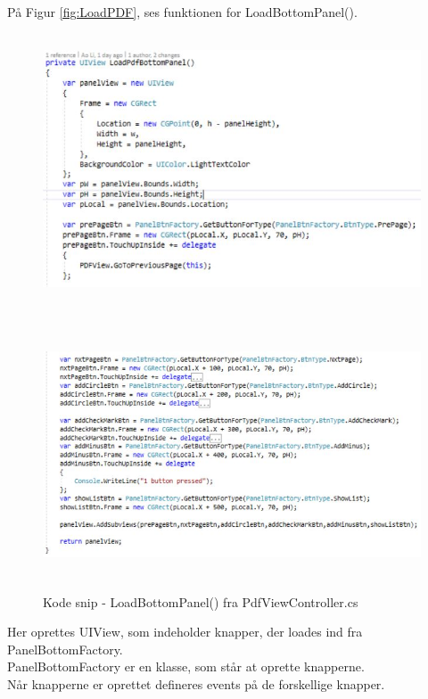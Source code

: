 På Figur \ref{fig:LoadPDF}, ses funktionen for LoadBottomPanel().
\begin{figure}[H] %
	\centering
	\includegraphics[height=8cm, width=15cm]{../ArkitekturDesign/Design/RegisterPDF/LoadBtnPanel1}
\end{figure}
\begin{figure}[H] %
	\centering
	\includegraphics[height=8cm, width=15cm]{../ArkitekturDesign/Design/RegisterPDF/LoadBtnPanel2}
	\caption{Kode snip - LoadBottomPanel() fra PdfViewController.cs}
	\label{fig:LoadBtnPanel2}
\end{figure}
Her oprettes UIView, som indeholder knapper, der loades ind fra PanelBottomFactory. \\
PanelBottomFactory er en klasse, som står at oprette knapperne. \\
Når knapperne er oprettet defineres events på de forskellige knapper. \\

\clearpage

